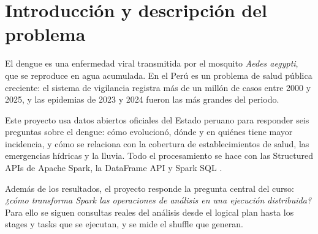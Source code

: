 \section{Introducción y descripción del problema}
\label{sec:introduction}

El dengue es una enfermedad viral transmitida por el mosquito \emph{Aedes aegypti}, que se reproduce en agua
acumulada. En el Perú es un problema de salud pública creciente: el sistema de vigilancia registra más de un
millón de casos entre 2000 y 2025, y las epidemias de 2023 y 2024 fueron las más grandes del periodo.

Este proyecto usa datos abiertos oficiales del Estado peruano para responder seis preguntas sobre el dengue:
cómo evolucionó, dónde y en quiénes tiene mayor incidencia, y cómo se relaciona con la cobertura de
establecimientos de salud, las emergencias hídricas y la lluvia. Todo el procesamiento se hace con las
Structured APIs de Apache Spark, la DataFrame API y Spark SQL \cite{zaharia2016,armbrust2015}.

Además de los resultados, el proyecto responde la pregunta central del curso: \emph{¿cómo transforma Spark
las operaciones de análisis en una ejecución distribuida?} Para ello se siguen consultas reales del análisis
desde el logical plan hasta los stages y tasks que se ejecutan, y se mide el shuffle que generan.
